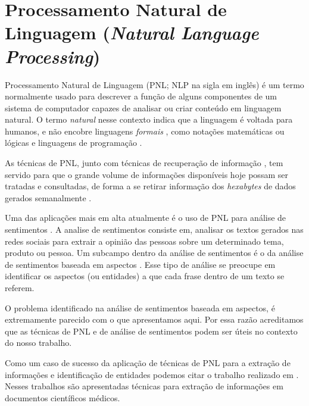 \documentclass[
	12pt,				%
	openright,			%
	twoside,			%
	a4paper,			%
	english,			%
	spanish,			%
	brazil,				%
	]{abntex2}
\begin{document}
\section{Processamento Natural de Linguagem (\emph{Natural Language Processing})}
Processamento Natural de Linguagem (PNL; NLP na sigla em inglês) é um termo normalmente usado para descrever a função de alguns componentes de um sistema de computador capazes de analisar ou criar conteúdo em linguagem natural. O termo \emph{natural} nesse contexto indica que a linguagem é voltada para humanos, e não encobre linguagens \emph{formais} , como notações matemáticas ou lógicas e linguagens de programação \cite{jackson2002natural}.

As técnicas de PNL, junto com técnicas de recuperação de informação \cite{manning2008introduction}, tem servido para que o grande volume de informações disponíveis hoje possam ser tratadas e consultadas, de forma a se retirar informação dos \emph{hexabytes} de dados gerados semanalmente \cite{cambria2014jumping}.


Uma das aplicações mais em alta atualmente é o uso de PNL para análise de sentimentos \cite{feldman2013techniques}. A analise de sentimentos consiste em, analisar os textos gerados nas redes sociais para extrair a opinião das pessoas sobre um determinado tema, produto ou pessoa. Um subcampo dentro da análise de sentimentos é o da análise de sentimentos baseada em aspectos \cite{feldman2013techniques}. Esse tipo de análise se preocupe em identificar os aspectos (ou entidades) a que cada frase dentro de um texto se referem.

O problema identificado na análise de sentimentos baseada em aspectos, é extremamente parecido com o que apresentamos aqui. Por essa razão acreditamos que as técnicas de PNL e de análise de sentimentos podem ser úteis no contexto do nosso trabalho.


Como um caso de sucesso da aplicação de técnicas de PNL para a extração de informações e identificação de entidades podemos citar o trabalho realizado em \cite{matos2010environment, duque2012processo}. Nesses trabalhos são apresentadas técnicas para extração de informações em documentos científicos médicos.
\end{document}

